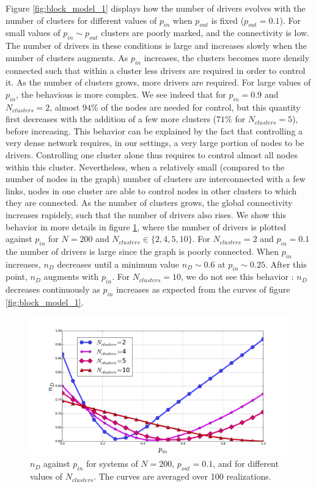 \documentclass[conference]{IEEEtran}
\begin{document}
Figure \ref{fig:block_model_1} displays how the number of drivers evolves with the number of clusters for different values of $ p_{in} $ when $ p_{out} $ is fixed ($p_{out} =0.1$). For small values of $ p_{in} \sim p_{out} $ clusters are poorly marked, and the connectivity is low. The number of drivers in these conditions is large and increases slowly when the number of clusters augments. As $ p_{in} $ increases, the clusters becomes more densily connected such that within a cluster less drivers are required in order to control it. As the number of clusters grows, more drivers are required. For large values of $p_{in} $, the behavious is more complex. We see indeed that for $p_{in} = 0.9 $ and $N_{clusters} = 2$, almost $ 94\% $ of the nodes are needed for control, but this quantity first decreases with the addition of a few more clusters ($ 71\% $ for $ N_{clusters}=5 $), before increasing. This behavior can be explained by the fact that controlling a very dense network requires, in our settings, a very large portion of nodes to be drivers. Controlling one cluster alone thus requires to control almost all nodes within this cluster. Nevertheless, when a relatively small (compared to the number of nodes in the graph) number of clusters are interconnected with a few links, nodes in one cluster are able to control nodes in other clusters to which they are connected. As the number of clusters grows, the global connectivity increases rapidely, such that the number of drivers also rises. We show this behavior in more details in figure \ref{fig:block_model_2}, where the number of drivers is plotted against $ p_{in} $ for $N=200$ and $N_{clusters} \in \{2,4,5,10\} $. For $N_{clusters} = 2 $ and $ p_{in} = 0.1 $ the number of drivers is large since the graph is poorly connected. When $p_{in} $ increases, $n_D$ decreases until a minimum value $n_D \sim 0.6 $ at $ p_{in} \sim 0.25 $. After this point, $n_D$ augments with $p_{in}$. For $N_{clusters} = 10 $, we do not see this behavior : $ n_D $ decreases continuously as $p_{in} $ increases as expected from the curves of figure \ref{fig:block_model_1}.


\begin{figure}
\includegraphics[scale=.25]{./figure_6/figure_6}
\caption{$n_D$ against $ p_{in} $ for systems of $N=200 $, $p_{out} = 0.1 $, and for different values of $N_{clusters} $. The curves are averaged over 100 realizations.}
\label{fig:block_model_2}
\end{figure}
\end{document}
